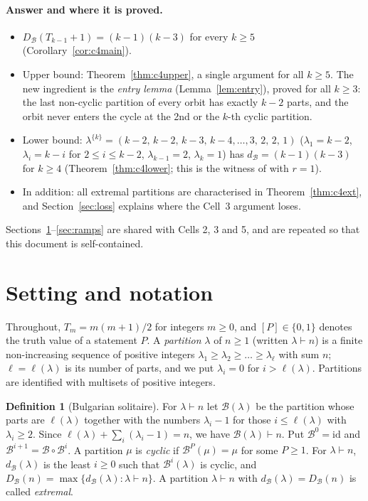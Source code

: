 \documentclass[11pt]{article}
\theoremstyle{definition}
\newtheorem{definition}[theorem]{Definition}
\newcommand{\B}{\mathcal{B}}
\newcommand{\dB}{d_{\mathcal{B}}}
\newcommand{\DB}{D_{\mathcal{B}}}
\renewcommand{\le}{\leqslant}
\renewcommand{\ge}{\geqslant}
\begin{document}
\paragraph{Answer and where it is proved.}
\begin{itemize}
\item $\DB(T_{k-1}+1)=(k-1)(k-3)$ for every $k\ge5$ (Corollary~\ref{cor:c4main}).
\item Upper bound: Theorem~\ref{thm:c4upper}, a single argument for all $k\ge5$.  The new ingredient is the
\emph{entry lemma} (Lemma~\ref{lem:entry}), proved for all $k\ge3$: the last non-cyclic partition of every orbit has
exactly $k-2$ parts, and the orbit never enters the cycle at the 2nd or the $k$-th cyclic partition.
\item Lower bound: $\lambda^{\{k\}}=(k-2,\,k-2,\,k-3,\,k-4,\dots,3,\,2,\,2,\,1)$ ($\lambda_1=k-2$, $\lambda_i=k-i$ for
$2\le i\le k-2$, $\lambda_{k-1}=2$, $\lambda_k=1$) has $\dB=(k-1)(k-3)$ for $k\ge4$ (Theorem~\ref{thm:c4lower}; this is the
witness of \cite[Thm.~4.5, case (1)]{GH} with $r=1$).
\item In addition: all extremal partitions are characterised in Theorem~\ref{thm:c4ext}, and Section~\ref{sec:loss}
explains where the Cell~3 argument loses.
\end{itemize}
Sections~\ref{sec:defs}--\ref{sec:ramps} are shared with Cells 2, 3 and 5, and are repeated so that this document is
self-contained.

\section{Setting and notation}\label{sec:defs}

Throughout, $T_m=m(m+1)/2$ for integers $m\ge 0$, and $[P]\in\{0,1\}$ denotes the truth value
of a statement $P$.
A \emph{partition} $\lambda$ of $n\ge 1$ (written $\lambda\vdash n$) is a finite non-increasing
sequence of positive integers $\lambda_1\ge\lambda_2\ge\dots\ge\lambda_\ell$ with sum $n$;
$\ell=\ell(\lambda)$ is its number of parts, and we put $\lambda_i=0$ for $i>\ell(\lambda)$.
Partitions are identified with multisets of positive integers.

\begin{definition}[Bulgarian solitaire]
For $\lambda\vdash n$ let $\B(\lambda)$ be the partition whose parts are $\ell(\lambda)$ together
with the numbers $\lambda_i-1$ for those $i\le\ell(\lambda)$ with $\lambda_i\ge 2$.
Since $\ell(\lambda)+\sum_{i}(\lambda_i-1)=n$, we have $\B(\lambda)\vdash n$.
Put $\B^0=\mathrm{id}$ and $\B^{i+1}=\B\circ\B^{i}$.
A partition $\mu$ is \emph{cyclic} if $\B^P(\mu)=\mu$ for some $P\ge 1$.
For $\lambda\vdash n$, $\dB(\lambda)$ is the least $i\ge 0$ such that $\B^i(\lambda)$ is cyclic,
and $\DB(n)=\max\{\dB(\lambda):\lambda\vdash n\}$.
A partition $\lambda\vdash n$ with $\dB(\lambda)=\DB(n)$ is called \emph{extremal}.
\end{definition}
\end{document}
